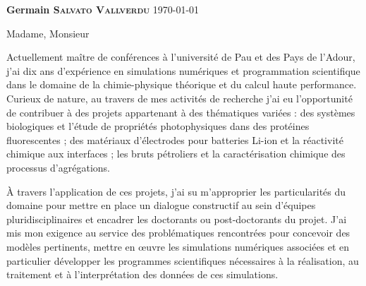 \documentclass[11pt,a4paper,ragged2e]{alta_letter}
\begin{document}
\name{}
\tagline{}


{\color{emphasis}\Large\bfseries Germain \textsc{Salvato Vallverdu}}
\hfill\today\par

\parbox{.5\textwidth}{\makecvheader}

\justify

\vspace{-5mm}
\cvsection{~}

\setlength{\parindent}{0pt}
\setlength{\parskip}{1.5ex plus 0.5ex minus 0.5ex}

\bigskip

Madame, Monsieur

\medskip
\onehalfspacing


Actuellement maître de conférences à l'université de Pau et des Pays de l'Adour, j'ai dix
ans d'expérience en simulations numériques et programmation scientifique dans le domaine
de la chimie-physique théorique et du calcul haute performance. Curieux de nature, au travers de mes activités de
recherche j'ai eu l'opportunité de contribuer à des projets appartenant à des thématiques
variées : des systèmes biologiques et l'étude de propriétés photophysiques dans des
protéines fluorescentes ; des matériaux d'électrodes pour batteries Li-ion et la
réactivité chimique aux interfaces ; les bruts pétroliers et la caractérisation chimique
des processus d'agrégations.

À travers l'application de ces projets, j'ai su m'approprier les particularités du domaine
pour mettre en place un dialogue constructif au sein d'équipes pluridisciplinaires et
encadrer les doctorants ou post-doctorants du projet. J'ai mis mon exigence au service des
problématiques rencontrées pour concevoir des modèles pertinents, mettre en œuvre les
simulations numériques associées et en particulier développer les programmes scientifiques
nécessaires à la réalisation, au traitement et à l'interprétation des données de ces
simulations.
\end{document}
